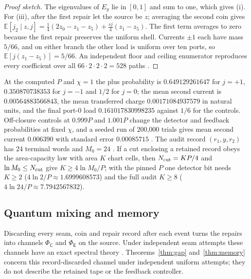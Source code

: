\documentclass[11pt]{article}
\theoremstyle{definition}
\theoremstyle{remark}
\theoremstyle{plain}
\newcommand{\Ex}{\mathbb{E}}
\newcommand{\Cn}{\mathsf{C}}
\newcommand{\En}{\mathsf{E}}
\begin{document}
\begin{proof}[Proof sketch]
The eigenvalues of $E_y$ lie in $[0,1]$ and sum to one, which gives (i). For
(iii), after the first repair let the source be $z$; averaging the second
coin gives $\Ex[j_2\mid z,j]=\frac14(2z_0-z_1-z_5)+\frac{sj}{4}(z_1-z_5)$.
The first term averages to zero because the first repair preserves the
uniform shell. Currents $\pm1$ each have mass $5/66$, and on either branch
the other load is uniform over ten ports, so $\Ex[j(z_1-z_5)]=5/66$. An
independent floor and ceiling enumerator reproduces every coefficient over
all $66\cdot2\cdot2\cdot2=528$ paths \cite{pDERIV,pVALID}.
\end{proof}

At the computed $P$ and $\chi=1$ the plus probability is $0.649129261647$ for
$j=+1$, $0.350870738353$ for $j=-1$ and $1/2$ for $j=0$; the mean second
current is $0.00564883566843$, the mean transferred charge
$0.00171084937579$ in natural units, and the final port-0 load
$0.161017830998235$ against $1/6$ for the controls. Off-closure controls at
$0.999P$ and $1.001P$ change the detector and feedback probabilities at fixed
$\chi$, and a seeded run of 200,000 trials gives mean second current
$0.006390$ with standard error $0.00085715$ \cite{pREADME,rP}. The audit
record $(r_1,y,r_2)$ has 24 terminal words and $M_0=24$ \cite{pACCESS}. If a
cut enclosing a retained record obeys the area-capacity law with area $K$
chart cells, then $N_{\rm cut}=KP/4$ and $\ln M_0\le N_{\rm cut}$ give
$K\ge4\ln M_0/P$; with the pinned $P$ one detector bit needs $K\ge2$
($4\ln2/P\approx1.6999608573$) and the full audit $K\ge8$
($4\ln24/P\approx7.7942567832$).

\subsection{Quantum mixing and memory}
\label{sec:mixing}

Discarding every seam, coin and repair record after each event turns the
repairs into channels $\Phi_\Cn$ and $\Phi_\En$ on the source. Under
independent seam attempts these channels have an exact spectral theory
\cite{oQM}. Theorems~\ref{thm:gap} and~\ref{thm:memory} concern this
record-discarded channel under independent uniform attempts; they do not
describe the retained tape or the feedback controller.
\end{document}
